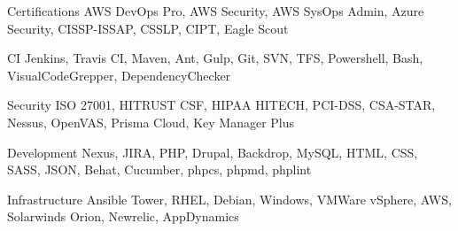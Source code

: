 


\begin{cvskills}


\cvskill
{Certifications}
{AWS DevOps Pro, AWS Security, AWS SysOps Admin, Azure Security, CISSP-ISSAP, CSSLP, CIPT, Eagle Scout }

\cvskill
{CI}
{Jenkins, Travis CI, Maven, Ant, Gulp, Git, SVN, TFS, Powershell, Bash, VisualCodeGrepper, DependencyChecker }

\cvskill
{Security}
{ISO 27001, HITRUST CSF, HIPAA HITECH, PCI-DSS, CSA-STAR, Nessus, OpenVAS, Prisma Cloud, Key Manager Plus }

\cvskill
{Development}
{Nexus, JIRA, PHP, Drupal, Backdrop, MySQL, HTML, CSS, SASS, JSON, Behat, Cucumber, phpcs, phpmd, phplint }

\cvskill
{Infrastructure}
{Ansible Tower, RHEL, Debian, Windows, VMWare vSphere, AWS, Solarwinds Orion, Newrelic, AppDynamics }




\end{cvskills}
